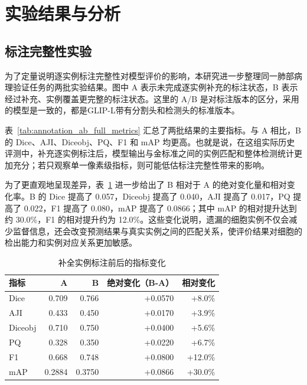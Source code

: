 \section{实验结果与分析}
\subsection{标注完整性实验}
为了定量说明逐实例标注完整性对模型评价的影响，本研究进一步整理同一肺部病理验证任务的两批实验结果。图中 A 表示未完成逐实例补充的标注状态，B 表示经过补充、实例覆盖更完整的标注状态。这里的 A/B 是对标注版本的区分，采用的模型是一致的，都是GLIP-L带有分割头和检测头的标准版本。

表~\ref{tab:annotation_ab_full_metrics} 汇总了两批结果的主要指标。与 A 相比，B 的 Dice、AJI、Diceobj、PQ、F1 和 mAP 均更高。也就是说，在这组实际历史评测中，补充逐实例标注后，模型输出与金标准之间的实例匹配和整体检测统计更加充分；若只观察单一像素级指标，则可能低估标注完整性带来的影响。

\begin{table}[htbp]
  \centering
  \caption{标注完整性对总体性能的影响}
  \label{tab:annotation_ab_full_metrics}
  \scriptsize
\end{table}

为了更直观地呈现差异，表~\ref{tab:annotation_ab_delta} 进一步给出了 B 相对于 A 的绝对变化量和相对变化率。B 的 Dice 提高了 0.057，Diceobj 提高了 0.040，AJI 提高了 0.017，PQ 提高了 0.022，F1 提高了 0.080，mAP 提高了 0.0866；其中 mAP 的相对提升达到约 30.0\%，F1 的相对提升约为 12.0\%。这些变化说明，遗漏的细胞实例不仅会减少监督信息，还会改变预测结果与真实实例之间的匹配关系，使评价结果对细胞的检出能力和实例对应关系更加敏感。

\begin{table}[htbp]
  \centering
  \caption{补全实例标注前后的指标变化}
  \label{tab:annotation_ab_delta}
  \small
  \begin{tabular}{lrrrr}
    \toprule
    指标 & A & B & 绝对变化（B-A） & 相对变化 \\
    \midrule
    Dice & 0.709 & 0.766 & +0.0570 & +8.0\% \\

    AJI & 0.433 & 0.450 & +0.0170 & +3.9\% \\
    Diceobj & 0.710 & 0.750 & +0.0400 & +5.6\% \\
    PQ & 0.328 & 0.350 & +0.0220 & +6.7\% \\
    F1 & 0.668 & 0.748 & +0.0800 & +12.0\% \\
    mAP & 0.2884 & 0.3750 & +0.0866 & +30.0\% \\
    \bottomrule
  \end{tabular}
\end{table}

